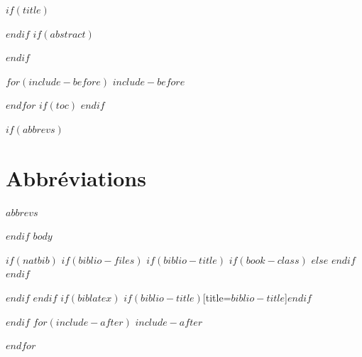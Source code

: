 \documentclass[$if(fontsize)$$fontsize$,$endif$$if(lang)$$lang$,$endif$$if(papersize)$$papersize$,$endif$$for(classoption)$$classoption$$sep$,$endfor$]{$documentclass$}
\title{\color{white}{$title$}}
\subtitle{\color{ocre}{$subtitle$}}
\author{\color{ocre}{$for(author)$$author$$sep$ \and $endfor$}}
\date{\color{white}{$date$}}
\begin{document}
$if(title)$
\maketitle
\ClearWallPaper
$endif$
$if(abstract)$
\begin{abstract}
$abstract$
\end{abstract}
$endif$

$for(include-before)$
$include-before$

$endfor$
$if(toc)$
{
\hypersetup{linkcolor=ocre}
\setcounter{tocdepth}{$toc-depth$}
\tableofcontents
}
$endif$


$if(abbrevs)$
\chapter*{Abbréviations}

$abbrevs$

$endif$
$body$

$if(natbib)$
$if(biblio-files)$
$if(biblio-title)$
$if(book-class)$
\renewcommand\bibname{$biblio-title$}
$else$
\renewcommand\refname{$biblio-title$}
$endif$
$endif$


$endif$
$endif$
$if(biblatex)$
\printbibliography$if(biblio-title)$[title=$biblio-title$]$endif$

$endif$
$for(include-after)$
$include-after$

$endfor$
\end{document}
